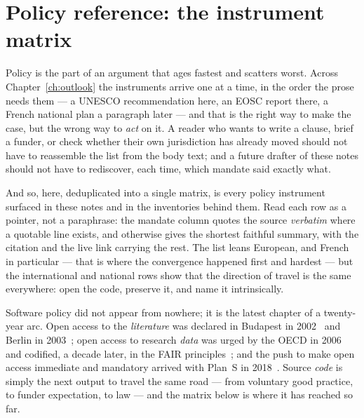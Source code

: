\chapter{Policy reference: the instrument matrix}
\label{app:policy}

Policy is the part of an argument that ages fastest and scatters worst. Across
Chapter~\ref{ch:outlook} the instruments arrive one at a time, in the order the prose needs
them --- a UNESCO recommendation here, an EOSC report there, a French national plan a paragraph
later --- and that is the right way to make the case, but the wrong way to \emph{act} on it. A
reader who wants to write a clause, brief a funder, or check whether their own jurisdiction has
already moved should not have to reassemble the list from the body text; and a future drafter of
these notes should not have to rediscover, each time, which mandate said exactly what.


\noindent And so, here, deduplicated into a single matrix, is every policy instrument surfaced in
these notes and in the inventories behind them. Read each row as a pointer, not a paraphrase: the
mandate column quotes the source \emph{verbatim} where a quotable line exists, and otherwise gives
the shortest faithful summary, with the citation and the live link carrying the rest. The list
leans European, and French in particular --- that is where the convergence happened first and
hardest --- but the international and national rows show that the direction of travel is the same
everywhere: open the code, preserve it, and name it intrinsically.

Software policy did not appear from nowhere; it is the latest chapter of a twenty-year arc. Open
access to the \emph{literature} was declared in Budapest in 2002~\autocite{boai2002} and Berlin in
2003~\autocite{berlin2003}; open access to research \emph{data} was urged by the OECD in
2006~\autocite{OECD2021ResearchData} and codified, a decade later, in the FAIR
principles~\autocite{fairdefinition2016}; and the push to make open access immediate and mandatory
arrived with Plan~S in 2018~\autocite{plans2018}. Source \emph{code} is simply the next output to
travel the same road --- from voluntary good practice, to funder expectation, to law --- and the
matrix below is where it has reached so far.

